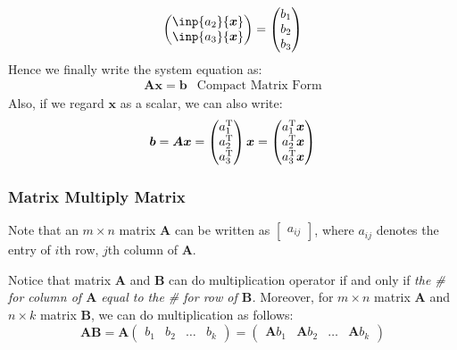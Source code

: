 \begin{example}
\[\begin{pmatrix}
\inp{a_2}{\bm x}\\
\inp{a_3}{\bm x}
\end{pmatrix}
=\begin{pmatrix}
b_1 \\ b_2 \\ b_3
\end{pmatrix}
\]
Hence we finally write the system equation as:
\[
\begin{array}{ll}
\bm{A}\bm{x} = \bm{b} &\mbox{Compact Matrix Form}
\end{array}
\]
Also, if we regard $\bm{x}$ as a scalar, we can also write:
\[
\bm{b} = \bm{A}\bm{x} = \begin{pmatrix}
a_1^{\mathrm T} \\ a_2^{\mathrm T} \\ a_3^{\mathrm T}
\end{pmatrix}\bm{x} = \begin{pmatrix}
a_1^{\mathrm T}\bm x \\ a_2^{\mathrm T}\bm x \\ a_3^{\mathrm T}\bm x
\end{pmatrix}
\]
\end{example}
\subsubsection{Matrix Multiply Matrix}
\begin{remark}
Note that an $m\times n$ matrix $\bm A$ can be written as $\begin{bmatrix}
a_{ij}
\end{bmatrix}$, where $a_{ij}$ denotes the entry of $i$th row, $j$th column of $\bm A $.\end{remark}

Notice that matrix $\bm A$ and $\bm B$ can do multiplication operator if and only if \emph{the \# for column of $\bm A$ equal to the \# for row of $\bm B$.} Moreover, for $m \times n$ matrix $\bm A$ and $n\times k$ matrix $\bm B$, we can do multiplication as follows:
\[
\bm A\bm B = \bm A \begin{pmatrix}
b_1 &b_2 & \dots & b_k
\end{pmatrix} = \begin{pmatrix}
\bm Ab_1 &\bm Ab_2 & \dots & \bm Ab_k
\end{pmatrix}
\]

